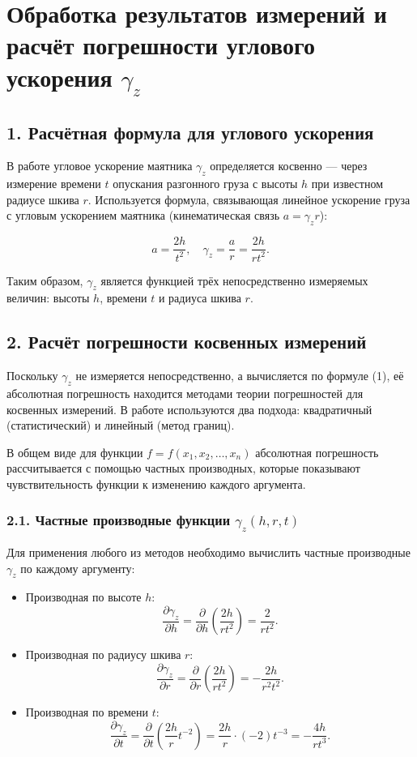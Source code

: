 \documentclass[a4paper,12pt]{article}
\begin{document}
\section*{Обработка результатов измерений и расчёт погрешности углового ускорения \(\gamma_z\)}

\subsection*{1. Расчётная формула для углового ускорения}

В работе угловое ускорение маятника \(\gamma_z\) определяется косвенно — через измерение времени \(t\) опускания разгонного груза с высоты \(h\) при известном радиусе шкива \(r\). Используется формула, связывающая линейное ускорение груза с угловым ускорением маятника (кинематическая связь \(a = \gamma_z r\)):

\[
a = \frac{2h}{t^2}, \quad \gamma_z = \frac{a}{r} = \frac{2h}{r t^2}. \tag{1}
\]

Таким образом, \(\gamma_z\) является функцией трёх непосредственно измеряемых величин: высоты \(h\), времени \(t\) и радиуса шкива \(r\).

\subsection*{2. Расчёт погрешности косвенных измерений}

Поскольку \(\gamma_z\) не измеряется непосредственно, а вычисляется по формуле (1), её абсолютная погрешность находится методами теории погрешностей для косвенных измерений. В работе используются два подхода: квадратичный (статистический) и линейный (метод границ).

В общем виде для функции \(f = f(x_1, x_2, \dots, x_n)\) абсолютная погрешность рассчитывается с помощью частных производных, которые показывают чувствительность функции к изменению каждого аргумента.

\subsubsection*{2.1. Частные производные функции \(\gamma_z(h, r, t)\)}

Для применения любого из методов необходимо вычислить частные производные \(\gamma_z\) по каждому аргументу:

\begin{itemize}
    \item Производная по высоте \(h\):
    \[
    \frac{\partial \gamma_z}{\partial h} = \frac{\partial}{\partial h} \left( \frac{2h}{r t^2} \right) = \frac{2}{r t^2}.
    \]
    \item Производная по радиусу шкива \(r\):
    \[
    \frac{\partial \gamma_z}{\partial r} = \frac{\partial}{\partial r} \left( \frac{2h}{r t^2} \right) = -\frac{2h}{r^2 t^2}.
    \]
    \item Производная по времени \(t\):
    \[
    \frac{\partial \gamma_z}{\partial t} = \frac{\partial}{\partial t} \left( \frac{2h}{r} t^{-2} \right) = \frac{2h}{r} \cdot (-2) t^{-3} = -\frac{4h}{r t^3}.
    \]
\end{itemize}
\end{document}
